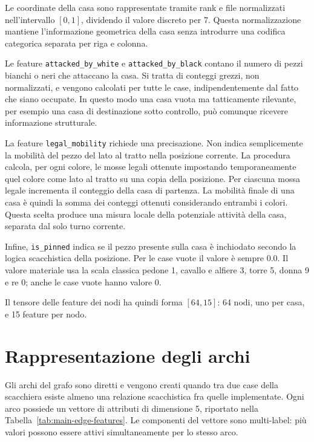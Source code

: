 Le coordinate della casa sono rappresentate tramite rank e file normalizzati nell'intervallo \([0,1]\), dividendo il valore discreto per 7. Questa normalizzazione mantiene l'informazione geometrica della casa senza introdurre una codifica categorica separata per riga e colonna.

Le feature \texttt{attacked\_by\_white} e \texttt{attacked\_by\_black} contano il numero di pezzi bianchi o neri che attaccano la casa. Si tratta di conteggi grezzi, non normalizzati, e vengono calcolati per tutte le case, indipendentemente dal fatto che siano occupate. In questo modo una casa vuota ma tatticamente rilevante, per esempio una casa di destinazione sotto controllo, pu\`o comunque ricevere informazione strutturale.

La feature \texttt{legal\_mobility} richiede una precisazione. Non indica semplicemente la mobilit\`a del pezzo del lato al tratto nella posizione corrente. La procedura calcola, per ogni colore, le mosse legali ottenute impostando temporaneamente quel colore come lato al tratto su una copia della posizione. Per ciascuna mossa legale incrementa il conteggio della casa di partenza. La mobilit\`a finale di una casa \`e quindi la somma dei conteggi ottenuti considerando entrambi i colori. Questa scelta produce una misura locale della potenziale attivit\`a della casa, separata dal solo turno corrente.

Infine, \texttt{is\_pinned} indica se il pezzo presente sulla casa \`e inchiodato secondo la logica scacchistica della posizione. Per le case vuote il valore \`e sempre 0.0. Il valore materiale usa la scala classica pedone 1, cavallo e alfiere 3, torre 5, donna 9 e re 0; anche le case vuote hanno valore 0.

Il tensore delle feature dei nodi ha quindi forma \([64,15]\): 64 nodi, uno per casa, e 15 feature per nodo.

\section{Rappresentazione degli archi}

Gli archi del grafo sono diretti e vengono creati quando tra due case della scacchiera esiste almeno una relazione scacchistica fra quelle implementate. Ogni arco possiede un vettore di attributi di dimensione 5, riportato nella Tabella~\ref{tab:main-edge-features}. Le componenti del vettore sono multi-label: pi\`u valori possono essere attivi simultaneamente per lo stesso arco.


